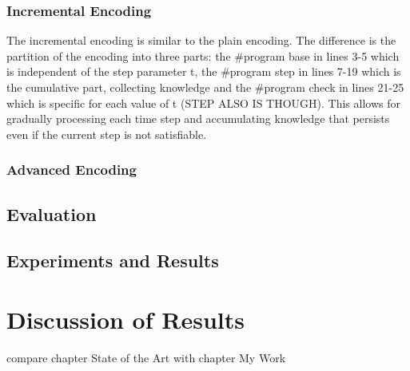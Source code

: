 \documentclass{article}
\begin{document}
\subsubsection{Incremental Encoding}

The incremental encoding is similar to the plain encoding. The difference is the partition of the encoding into three parts: the \#program base in lines 3-5 which is independent of the step parameter t, the \#program step in lines 7-19 which is the cumulative part, collecting knowledge and the \#program check in lines 21-25 which is specific for each value of t (STEP ALSO IS THOUGH). This allows for gradually processing each time step and accumulating knowledge that persists even if the current step is not satisfiable.

\subsubsection{Advanced Encoding}

\subsection{Evaluation}
\subsection{Experiments and Results}
\section{Discussion of Results}
compare chapter State of the Art with chapter My Work \cite{LifschitzASP}
\end{document}
